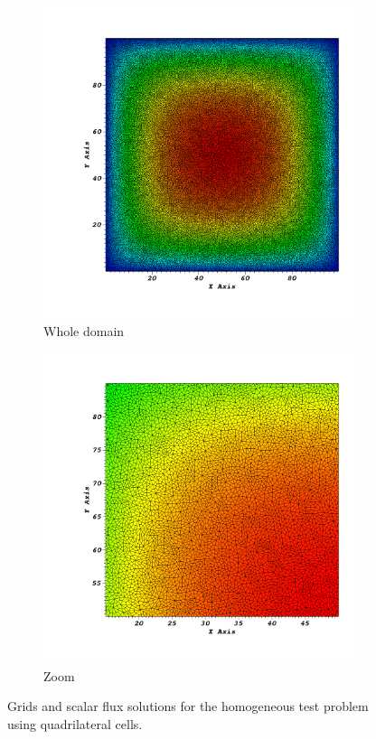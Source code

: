 \documentclass[preprint,10pt]{elsarticle}
\renewcommand{\(}{\left(}
\renewcommand{\)}{\right)}
\renewcommand{\[}{\left[}
\renewcommand{\]}{\right]}
\begin{document}
\begin{figure}[!htbp]
  \centering
  \begin{subfigure}{0.45\textwidth}
    \centering
    \includegraphics[width=\textwidth]{quad_solu0000}
    \caption{Whole domain}
  \end{subfigure}
  \begin{subfigure}{0.45\textwidth}
    \centering
    \includegraphics[width=\textwidth]{quad_solu0001}
    \caption{Zoom}
  \end{subfigure}
  \caption{Grids and scalar flux solutions for the homogeneous test problem using quadrilateral cells.}
  \label{homog_test_quads}
\end{figure}
\end{document}
